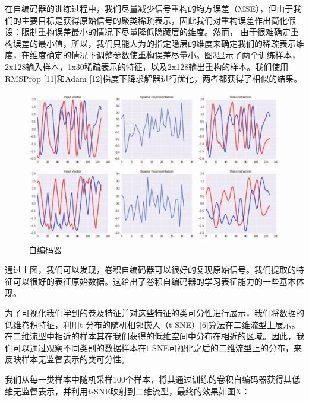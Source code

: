 在自编码器的训练过程中，我们尽量减少信号重构的均方误差（MSE），但由于我们的主要目标是获得原始信号的聚类稀疏表示，因此我们对重构误差作出简化假设：限制重构误差最小的情况下尽量降低隐藏层的维度。然而， 由于很难确定重构误差的最小值，所以，我们只能人为的指定隐层的维度来确定我们的稀疏表示维度，在维度确定的情况下调整参数使重构误差尽量小。图3显示了两个训练样本，2x128输入样本，1x30稀疏表示的特征，以及2x128输出重构的样本。我们使用RMSProp [11]和Adam [12]梯度下降求解器进行优化，两者都获得了相似的结果。\par

\begin{figure}[!h]
	\centering
	\includegraphics[scale=0.2]{figures/chapter_3/examples_cae}
	\caption{自编码器}	\label{fig_3_4}
\end{figure} 
通过上图，我们可以发现，卷积自编码器可以很好的复现原始信号。我们提取的特征可以很好的表征原始数据。这给出了卷积自编码器的学习表征能力的一些基本体现。\par

为了可视化我们学到的卷及特征并对这些特征的类可分性进行展示，我们将数据的低维卷积特征，利用t-分布的随机相邻嵌入（t-SNE）[6]算法在二维流型上展示。在二维流型中相近的样本其在我们获得的低维空间中分布在相近的区域。因此，我们可以通过观察不同类别的数据样本在t-SNE可视化之后的二维流型上的分布，来反映样本无监督表示的类可分性。\par

我们从每一类样本中随机采样100个样本，将其通过训练的卷积自编码器获得其低维无监督表示，并利用t-SNE映射到二维流型，最终的效果如图X：

